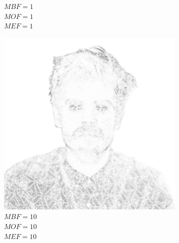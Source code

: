 \begin{figure}[H]
\begin{subfigure}{0.32\textwidth}
        \caption{\(MBF = 1\) \\ \(MOF = 1\) \\ \(MEF = 1\)}
        \label{mine-param-taco-b}
    \end{subfigure}
    \begin{subfigure}{0.32\textwidth}
        \centering
        \includegraphics[width = \textwidth]{img/4-mine/taco-mask/taco_mask_c20_inv0_bg10_obj10_ed10.png}
        \caption{\(MBF = 10\) \\ \(MOF = 10\) \\ \(MEF = 10\)}
        \label{mine-param-taco-c}
    \end{subfigure}\\
    \begin{subfigure}{0.32\textwidth}
        \centering

\end{subfigure}
\end{figure}
